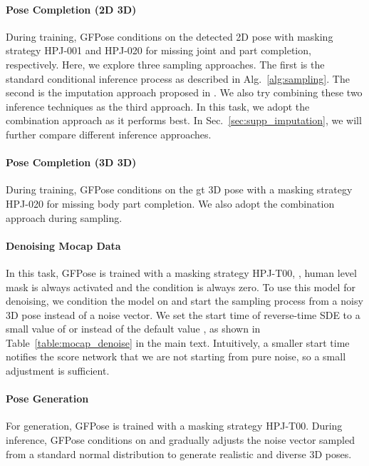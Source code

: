 \documentclass[10pt,twocolumn,letterpaper]{article}
\begin{document}
\paragraph{Pose Completion (2D  3D)}
During training, GFPose conditions on the detected 2D pose with masking strategy HPJ-001 and HPJ-020 for missing joint and part completion, respectively. 
Here, we explore three sampling approaches. The first is the standard conditional inference process as described in Alg.~\ref{alg:sampling}. The second is the imputation approach proposed in \cite{song2020score}. We also try combining these two inference techniques as the third approach.  In this task, we adopt the combination approach as it performs best. In Sec.~\ref{sec:supp_imputation}, we will further compare different inference approaches.




\paragraph{Pose Completion (3D  3D)}
During training, GFPose conditions on the gt 3D pose with a masking strategy HPJ-020 for missing body part completion. We also adopt the combination approach during sampling.




\paragraph{Denoising Mocap Data}
In this task, GFPose is trained with a masking strategy HPJ-T00, \ie, human level mask is always activated and the condition is always zero. To use this model for denoising, we condition the model on  and start the sampling process from a noisy 3D pose  instead of a noise vector. We set the start time  of reverse-time SDE to a small value of  or  instead of the default value , as shown in Table~\ref{table:mocap_denoise} in the main text. Intuitively, a smaller start time notifies the score network  that we are not starting from pure noise, so a small adjustment is sufficient.

\paragraph{Pose Generation}
For generation, GFPose is trained with a masking strategy HPJ-T00. During inference, GFPose conditions on  and gradually adjusts the noise vector  sampled from a standard normal distribution  to generate realistic and diverse 3D poses. 
\end{document}
